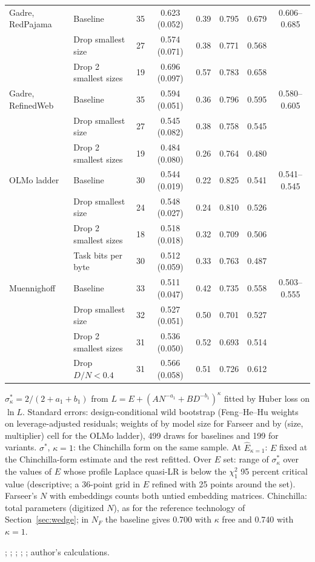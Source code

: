 \begin{table}[tp]
\begin{tabular*}{\textwidth}{@{\extracolsep{\fill}}llrccccc@{}}
Gadre, RedPajama & Baseline & 35 & 0.623 (0.052) & 0.39 & 0.795 & 0.679 & 0.606--0.685 \\
 & Drop smallest size & 27 & 0.574 (0.071) & 0.38 & 0.771 & 0.568 &  \\
 & Drop 2 smallest sizes & 19 & 0.696 (0.097) & 0.57 & 0.783 & 0.658 &  \\
\addlinespace[1pt]
Gadre, RefinedWeb & Baseline & 35 & 0.594 (0.051) & 0.36 & 0.796 & 0.595 & 0.580--0.605 \\
 & Drop smallest size & 27 & 0.545 (0.082) & 0.38 & 0.758 & 0.545 &  \\
 & Drop 2 smallest sizes & 19 & 0.484 (0.080) & 0.26 & 0.764 & 0.480 &  \\
\addlinespace[1pt]
OLMo ladder & Baseline & 30 & 0.544 (0.019) & 0.22 & 0.825 & 0.541 & 0.541--0.545 \\
 & Drop smallest size & 24 & 0.548 (0.027) & 0.24 & 0.810 & 0.526 &  \\
 & Drop 2 smallest sizes & 18 & 0.518 (0.018) & 0.32 & 0.709 & 0.506 &  \\
 & Task bits per byte & 30 & 0.512 (0.059) & 0.33 & 0.763 & 0.487 &  \\
\addlinespace[1pt]
Muennighoff & Baseline & 33 & 0.511 (0.047) & 0.42 & 0.735 & 0.558 & 0.503--0.555 \\
 & Drop smallest size & 32 & 0.527 (0.051) & 0.50 & 0.701 & 0.527 &  \\
 & Drop 2 smallest sizes & 31 & 0.536 (0.050) & 0.52 & 0.693 & 0.514 &  \\
 & Drop $D/N<0.4$ & 31 & 0.566 (0.058) & 0.51 & 0.726 & 0.612 &  \\
\bottomrule
\end{tabular*}
\par\smallskip
\begin{tablenotes}
$\sigma^*_\kappa=2/(2+a_1+b_1)$ from $L=E+(AN^{-a_1}+BD^{-b_1})^\kappa$ fitted by Huber loss on $\ln L$. Standard errors:
design-conditional wild bootstrap (Feng--He--Hu weights on leverage-adjusted residuals; weights of
\citet{webb2023reworking} by model size for Farseer and by (size, multiplier) cell for the OLMo ladder), 499 draws for
baselines and 199 for variants. $\sigma^*$, $\kappa=1$: the Chinchilla form on the same sample. At $\hat E_{\kappa=1}$:
$E$ fixed at the Chinchilla-form estimate and the rest refitted. Over $E$ set: range of $\sigma^*_\kappa$ over the values
of $E$ whose profile Laplace quasi-LR is below the $\chi^2_1$ 95 percent critical value (descriptive; a 36-point grid in
$E$ refined with 25 points around the set). Farseer's $N$ with embeddings counts both untied embedding matrices. Chinchilla: total parameters (digitized $N$), as for the
reference technology of Section~\ref{sec:wedge}; in $N_F$ the baseline gives 0.700 with $\kappa$ free and 0.740 with
$\kappa=1$.
\end{tablenotes}
\begin{tablenotes}[Source]
\citet{hoffmann2022training}; \citet{li2025predictableb}; \citet{gadre2024language}; \citet{bhagia2024establishing};
\citet{muennighoff2023scaling}; author's calculations.
\end{tablenotes}
\end{table}
